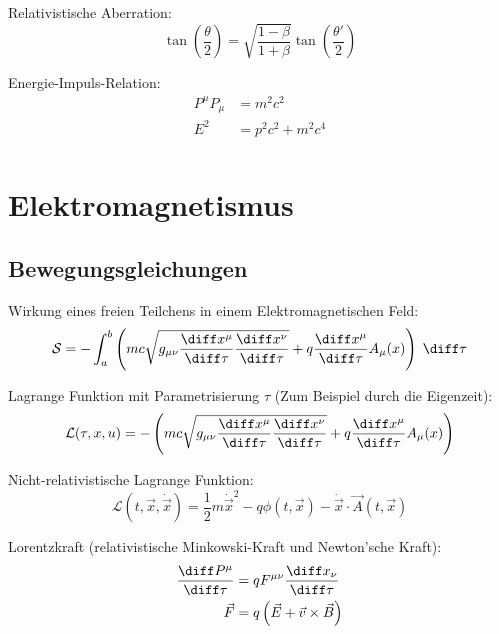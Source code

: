 \documentclass[11pt]{article}
\numberwithin{equation}{section}
\begin{document}
          Relativistische Aberration:
          \begin{equation}
            \tan\left(\frac{\theta}{2}\right) = \sqrt{\frac{1-\beta}{1+\beta}}\tan\left(\frac{\theta'}{2}\right)
          \end{equation}

          Energie-Impuls-Relation:
          \begin{equation}
            \begin{aligned}
              P^\mu P_\mu &= m^2 c^2\\
              E^2 &= p^2 c^2 + m^2 c^4 \\
            \end{aligned}
          \end{equation}


  \newpage
	\section{Elektromagnetismus}
		\subsection{Bewegungsgleichungen}
			Wirkung eines freien Teilchens in einem Elektromagnetischen Feld:
			\begin{equation}
				\mathcal{S}=-\int_{a}^{b}\left(mc\sqrt{g_{\mu\nu}\frac{\diff x^\mu}{\diff \tau}\frac{\diff x^\nu}{\diff \tau}}
        + q\frac{\diff x^\mu}{\diff \tau}A_\mu(x)\right)\;\diff\tau
			\end{equation}

			Lagrange Funktion mit Parametrisierung $\tau$ (Zum Beispiel durch die Eigenzeit):
			\begin{equation}
				\mathcal{L} (\tau,x,u) =-\left(mc\sqrt{g_{\mu\nu}\frac{\diff x^\mu}{\diff \tau}\frac{\diff x^\nu}{\diff \tau}}
				+ q\frac{\diff x^\mu}{\diff \tau}A_\mu(x)\right)
			\end{equation}

			Nicht-relativistische Lagrange Funktion:
			\begin{equation}
				\mathcal{L}(t,\vec{x},\dot{\vec{x}}) = \frac{1}{2}m\dot{\vec{x}}^2 - q\phi(t,\vec{x}) - \dot{\vec{x}}\cdot\vec{A}(t,\vec{x})
			\end{equation}

			Lorentzkraft (relativistische Minkowski-Kraft und Newton'sche Kraft):
			\begin{equation}
        \begin{aligned}
          \frac{\diff P^\mu}{\diff \tau} &= q F^{\mu\nu}\frac{\diff x_\nu}{\diff \tau} \\
          \vec{F} &= q\left(\vec{E}+\vec{v}\times\vec{B}\right) \\
        \end{aligned}
			\end{equation}
\end{document}
